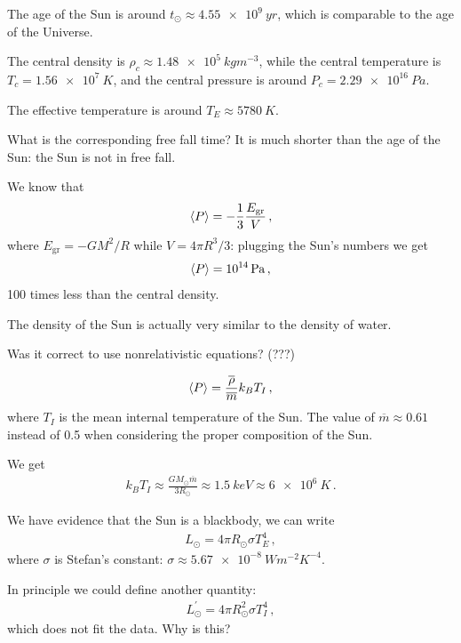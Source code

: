 \documentclass[main.tex]{subfiles}
\begin{document}
The age of the Sun is around \(t_{\odot} \approx \SI{4.55e9}{yr}\), which is comparable to the age of the Universe. 

The central density is \(\rho _c \approx \SI{1.48e5}{kg m^{-3}}\), while the central temperature is \(T_c = \SI{1.56e7}{K}\), and the central pressure is around \(P_c = \SI{2.29e16}{Pa}\).  

The effective temperature is around \(T_E \approx \SI{5780}{K}\). 

What is the corresponding free fall time? It is much shorter than the age of the Sun: the Sun is not in free fall. 

We know that 
%
\begin{align}
  \expval{P} = -\frac{1}{3} \frac{E _{\text{gr}}}{V}
\,,
\end{align}
%
where \(E _{\text{gr}} = - G M^2/R\) while \(V = 4 \pi R^3/3\): plugging the Sun's numbers we get 
%
\begin{align}
  \expval{P} = \SI{e14}{Pa}
\,,
\end{align}
%
100 times less than the central density. 

The density of the Sun is actually very similar to the density of water. 

Was it correct to use nonrelativistic equations? (???)

%
\begin{align}
  \expval{P} = \frac{\overline{\rho}}{\overline{m}} k_B T_I
\,,
\end{align}
%
where \(T_I\) is the mean internal temperature of the Sun. 
The value of \(\overline{m} \approx 0.61\) instead of 0.5 when considering the proper composition of the Sun. 

We get 
%
\begin{align}
  k_B T_I \approx \frac{G M_{\odot} \overline{m}}{3 R_{\odot} } \approx \SI{1.5}{keV} \approx \SI{6e6}{K}
\,.
\end{align}

We have evidence that the Sun is a blackbody, we can write 
%
\begin{align}
  L_{\odot} = 4 \pi R_{\odot} \sigma T^{4}_{E}
\,,
\end{align}
%
where \(\sigma \) is Stefan's constant: \(\sigma \approx \SI{5.67e-8}{W m^{-2} K^{-4}}\). 

In principle we could define another quantity: 
%
\begin{align}
  L_{\odot}^{\prime } = 4 \pi R_{\odot}^2 \sigma T_I^4
\,,
\end{align}
%
which does not fit the data. Why is this? 
\end{document}
